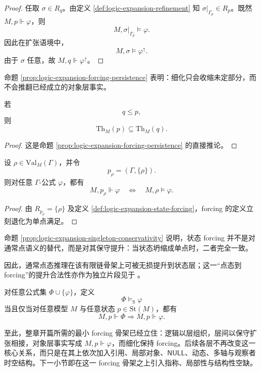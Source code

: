 \begin{proof}
任取 \(\sigma\in R_q\)。由定义 \ref{def:logic-expansion-refinement} 知 \(\sigma|_{\Gamma_p}\in R_p\)。既然 \(M,p\Vdash \varphi\)，则
\[
M,\sigma|_{\Gamma_p}\models \varphi.
\]
因此在扩张语境中，
\[
M,\sigma\models \varphi^\uparrow.
\]
由于 \(\sigma\) 任意，故 \(M,q\Vdash \varphi^\uparrow\)。
\end{proof}

命题 \ref{prop:logic-expansion-forcing-persistence} 表明：细化只会收缩未定部分，而不会推翻已经成立的对象层事实。

\begin{corollary}[状态理论的单调增长]\label{cor:logic-expansion-state-theory-monotonicity}
若
\[
q\le p,
\]
则
\[
\mathrm{Th}_M(p)\subseteq \mathrm{Th}_M(q).
\]
\end{corollary}

\begin{proof}
这是命题 \ref{prop:logic-expansion-forcing-persistence} 的直接推论。
\end{proof}

\begin{proposition}[单点保守性]\label{prop:logic-expansion-singleton-conservativity}
设 \(\rho\in \mathrm{Val}_M(\Gamma)\)，并令
\[
p_\rho=(\Gamma,\{\rho\}).
\]
则对任意 \(\Gamma\)-公式 \(\varphi\)，都有
\[
M,p_\rho\Vdash \varphi
\quad\Longleftrightarrow\quad
M,\rho\models \varphi.
\]
\end{proposition}

\begin{proof}
由 \(R_{p_\rho}=\{\rho\}\) 及定义 \ref{def:logic-expansion-state-forcing}，forcing 的定义立刻退化为单点满足。
\end{proof}

命题 \ref{prop:logic-expansion-singleton-conservativity} 说明，状态 forcing 并不是对通常点语义的替代，而是对其保守提升：当状态坍缩成单点时，二者完全一致。

因此，通常点态推理在该有限链骨架上可被无损提升到状态层；这一“点态到 forcing”的提升合法性亦作为独立片段见于 \cite{MaZhang2026StateForcingSemantics}。

\begin{definition}[状态语义后承]\label{def:logic-expansion-state-consequence}
对任意公式集 \(\Phi\cup\{\varphi\}\)，定义
\[
\Phi \models_{\mathrm{S}} \varphi
\]
当且仅当对任意模型 \(M\) 与任意状态 \(p\in \mathrm{St}(M)\)，都有
\[
M,p\Vdash \Phi
\Rightarrow
M,p\Vdash \varphi.
\]
\end{definition}

至此，整章开篇所需的最小 forcing 骨架已经立住：逻辑以层组织，层间以保守扩张相接，对象层事实写成 \(M,p\Vdash \varphi\)，而细化保持 forcing。后续各层不再改变这一核心关系，而只是在其上依次加入引用、局部对象、\(\mathsf{NULL}\)、动态、多轴与观察者时空结构。下一小节即在这一 forcing 骨架之上引入指称、局部性与结构性空缺。
